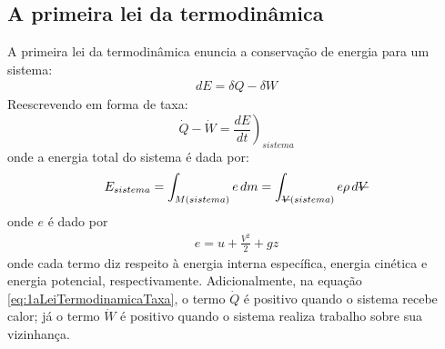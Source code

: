 \documentclass{article}
\newcommand{\stkout}[1]{\ifmmode\text{\sout{\ensuremath{#1}}}\else\sout{#1}\fi}
\begin{document}
\subsection{A primeira lei da termodinâmica}
A primeira lei da termodinâmica enuncia a conservação de energia para um sistema:
\begin{align*}
  dE=\delta Q - \delta W
\end{align*}
Reescrevendo em forma de taxa:
\begin{equation}
  \dot{Q}-\dot{W}=\left.\frac{dE}{dt}\right)_{sistema}
  \label{eq:1aLeiTermodinamicaTaxa}
\end{equation}
onde a energia total do sistema é dada por:
\begin{equation}
  E_{sistema}=\int_{M(sistema)}^{ } e\, dm = \int_{\stkout{V}(sistema)}^{ } e\rho\, d\stkout{V}
  \label{eq:energiaTotalSistema}
\end{equation}
onde $e$ é dado por
\begin{align*}
  e = u+\frac{V^2}{2}+gz
\end{align*}
onde cada termo diz respeito à energia interna específica, energia cinética e energia potencial, respectivamente. Adicionalmente, na equação \ref{eq:1aLeiTermodinamicaTaxa}, o termo $\dot{Q}$ é positivo quando o sistema recebe calor; já o termo $\dot{W}$ é positivo quando o sistema realiza trabalho sobre sua vizinhança.
\end{document}
